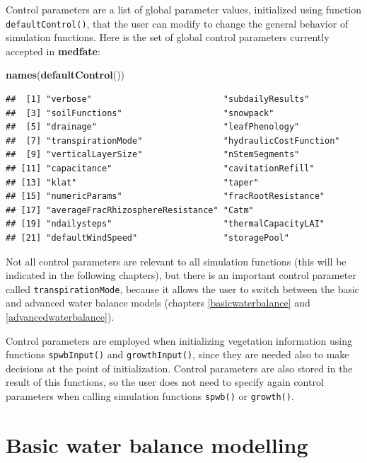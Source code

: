 \documentclass[]{book}
\newenvironment{Shaded}{\begin{snugshade}}{\end{snugshade}}
\newcommand{\KeywordTok}[1]{\textcolor[rgb]{0.13,0.29,0.53}{\textbf{#1}}}
\newcommand{\NormalTok}[1]{#1}
\begin{document}
Control parameters are a list of global parameter values, initialized
using function \texttt{defaultControl()}, that the user can modify to
change the general behavior of simulation functions. Here is the set of
global control parameters currently accepted in \textbf{medfate}:

\begin{Shaded}
\begin{Highlighting}[]
\KeywordTok{names}\NormalTok{(}\KeywordTok{defaultControl}\NormalTok{())}
\end{Highlighting}
\end{Shaded}

\begin{verbatim}
##  [1] "verbose"                          "subdailyResults"                 
##  [3] "soilFunctions"                    "snowpack"                        
##  [5] "drainage"                         "leafPhenology"                   
##  [7] "transpirationMode"                "hydraulicCostFunction"           
##  [9] "verticalLayerSize"                "nStemSegments"                   
## [11] "capacitance"                      "cavitationRefill"                
## [13] "klat"                             "taper"                           
## [15] "numericParams"                    "fracRootResistance"              
## [17] "averageFracRhizosphereResistance" "Catm"                            
## [19] "ndailysteps"                      "thermalCapacityLAI"              
## [21] "defaultWindSpeed"                 "storagePool"
\end{verbatim}

Not all control parameters are relevant to all simulation functions
(this will be indicated in the following chapters), but there is an
important control parameter called \texttt{transpirationMode}, because
it allows the user to switch between the basic and advanced water
balance models (chapters \ref{basicwaterbalance} and
\ref{advancedwaterbalance}).

Control parameters are employed when initializing vegetation information
using functions \texttt{spwbInput()} and \texttt{growthInput()}, since
they are needed also to make decisions at the point of initialization.
Control parameters are also stored in the result of this functions, so
the user does not need to specify again control parameters when calling
simulation functions \texttt{spwb()} or \texttt{growth()}.

\part{Basic water balance
modelling}\label{part-basic-water-balance-modelling}
\end{document}
